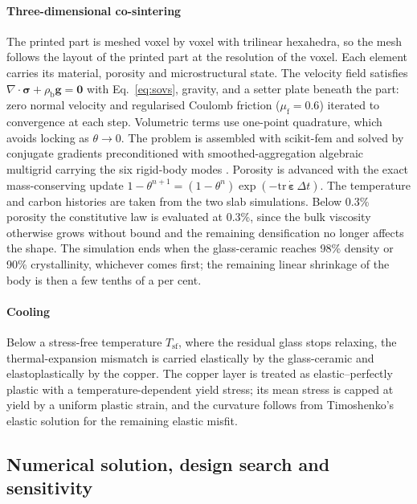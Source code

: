 \paragraph{Three-dimensional co-sintering} The printed part is meshed voxel by voxel with trilinear hexahedra, so the mesh follows the layout of the printed part at the resolution of the voxel. Each element carries its material, porosity and microstructural state. The velocity field satisfies $\nabla\cdot\boldsymbol{\sigma} + \rho_{\mathrm{b}}\mathbf{g} = \mathbf{0}$ with Eq.~\eqref{eq:sovs}, gravity, and a setter plate beneath the part: zero normal velocity and regularised Coulomb friction ($\mu_{\mathrm{f}} = 0.6$) iterated to convergence at each step. Volumetric terms use one-point quadrature, which avoids locking as $\theta \to 0$. The problem is assembled with scikit-fem \cite{gustafsson2020scikit} and solved by conjugate gradients preconditioned with smoothed-aggregation algebraic multigrid carrying the six rigid-body modes \cite{bell2022pyamg}. Porosity is advanced with the exact mass-conserving update $1-\theta^{n+1} = (1-\theta^{n})\exp(-\mathrm{tr}\,\dot{\boldsymbol{\varepsilon}}\,\Delta t)$. The temperature and carbon histories are taken from the two slab simulations. Below 0.3\% porosity the constitutive law is evaluated at 0.3\%, since the bulk viscosity otherwise grows without bound and the remaining densification no longer affects the shape. The simulation ends when the glass-ceramic reaches 98\% density or 90\% crystallinity, whichever comes first; the remaining linear shrinkage of the body is then a few tenths of a per cent.

\paragraph{Cooling} Below a stress-free temperature $T_{\mathrm{sf}}$, where the residual glass stops relaxing, the thermal-expansion mismatch is carried elastically by the glass-ceramic and elastoplastically by the copper. The copper layer is treated as elastic--perfectly plastic with a temperature-dependent yield stress; its mean stress is capped at yield by a uniform plastic strain, and the curvature follows from Timoshenko's elastic solution for the remaining elastic misfit.

\subsection{Numerical solution, design search and sensitivity}
\label{sec:numerics}

